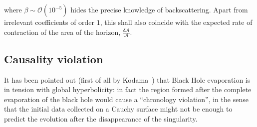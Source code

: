 where \(\beta \sim \mathcal{O}(10^{-5})\) hides the precise knowledge of backscattering. Apart from irrelevant coefficients of order \(1\), this shall also coincide with the expected rate of contraction of the area of the horizon, \(\frac{\delta\mathcal{A}}{\mathcal{A}}\).


\subsection{Causality violation}
\label{subsec:causaliy-bh-evaporation}
It has been pointed out (first of all by Kodama~\cite{Kodama:1979vm}) that Black Hole evaporation is in tension with global hyperbolicity: in fact the region formed after the complete evaporation of the black hole would cause a ``chronology violation'', in the sense that the initial data collected on a Cauchy surface might not be enough to predict the evolution after the disappearance of the singularity.

